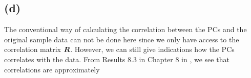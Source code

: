 \subsection*{(d)}
\label{sec:d-3}

The conventional way of calculating the correlation between the PCs and
the original sample data can not be done here since we only have access
to the correlation matrix $\bm{R}$. However, we can still give indications
how the PCs correlates with the data. From Results 8.3 in Chapter 8 in
\cite[p.433]{book}, we see that correlations are approximately
\begin{comment}
\begin{equation*}
  \begin{pmatrix}
    0.09 &0.02 &-0.04 &0.04 &-0.10 &3.63 \\ 
    0.21 &0.21 &0.04 &-0.15 &-0.00 &3.06 \\ 
    -0.31 &0.09 &0.21 &0.40 &-0.02 &2.79 \\ 
    0.12 &0.16 &-0.04 &-0.08 &-0.09 &3.48 \\ 
    0.10 &0.06 &0.02 &-0.11 &-0.11 &3.47 \\ 
    0.10 &0.03 &-0.04 &-0.12 &-0.09 &3.62 \\ 
    0.16 &0.23 &-0.03 &-0.10 &0.51 &2.56 \\ 
    0.03 &0.07 &0.26 &-0.07 &-0.32 &3.43 \\ 
    -0.05 &-0.16 &0.33 &-0.37 &0.06 &3.01 \\ 
    0.00 &-0.01 &-0.05 &-0.11 &-0.23 &3.50 \\ 
    -0.15 &0.08 &-0.09 &-0.20 &-0.01 &3.54 \\ 
    0.26 &-0.13 &-0.10 &0.21 &-0.19 &2.82 \\ 
    0.06 &-0.10 &-0.10 &0.23 &-0.12 &3.15 \\ 
    0.11 &-0.06 &-0.12 &0.23 &-0.06 &3.33 \\ 
    -0.19 &-0.24 &-0.43 &-0.44 &0.29 &2.30 \\ 
    -0.08 &0.09 &-0.22 &0.40 &0.35 &2.52 \\ 
    -0.05 &0.03 &-0.04 &0.18 &0.37 &2.96 \\ 
    -0.17 &-0.34 &0.10 &0.06 &-0.18 &2.79 \\ 
    -0.15 &-0.22 &-0.09 &0.09 &-0.14 &3.31 \\ 
    -0.37 &0.34 &0.10 &-0.09 &0.04 &2.51 \\ 
    0.14 &-0.28 &0.38 &0.05 &0.64 &1.88  
  \end{pmatrix}.
\end{equation*}
\end{comment}
